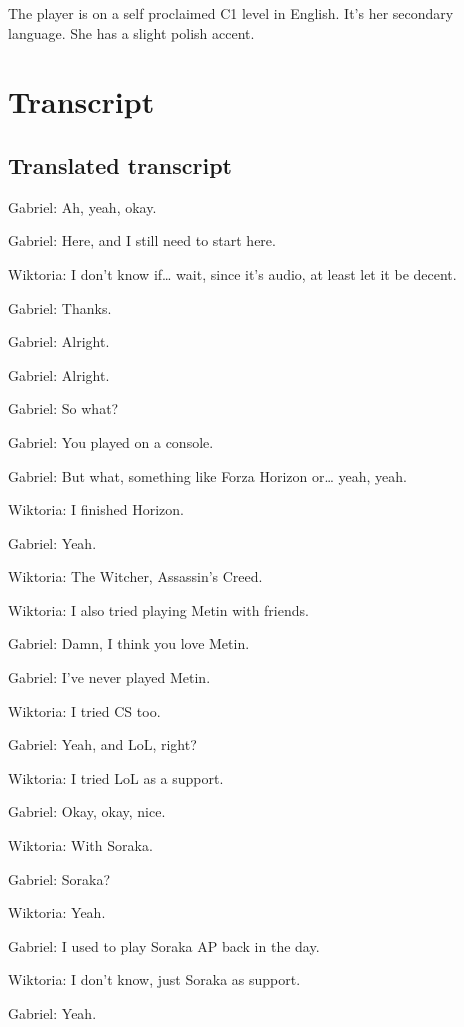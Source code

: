 
The player is on a self proclaimed C1 level in English. It's her secondary language. She has a slight polish accent.

\section{Transcript}

\subsection{Translated transcript}
Gabriel: Ah, yeah, okay.

Gabriel: Here, and I still need to start here.

Wiktoria: I don’t know if… wait, since it’s audio, at least let it be decent.

Gabriel: Thanks.

Gabriel: Alright.

Gabriel: Alright.

Gabriel: So what?

Gabriel: You played on a console.

Gabriel: But what, something like Forza Horizon or… yeah, yeah.

Wiktoria: I finished Horizon.

Gabriel: Yeah.

Wiktoria: The Witcher, Assassin’s Creed.

Wiktoria: I also tried playing Metin with friends.

Gabriel: Damn, I think you love Metin.

Gabriel: I’ve never played Metin.

Wiktoria: I tried CS too.

Gabriel: Yeah, and LoL, right?

Wiktoria: I tried LoL as a support.

Gabriel: Okay, okay, nice.

Wiktoria: With Soraka.

Gabriel: Soraka?

Wiktoria: Yeah.

Gabriel: I used to play Soraka AP back in the day.

Wiktoria: I don’t know, just Soraka as support.

Gabriel: Yeah.

